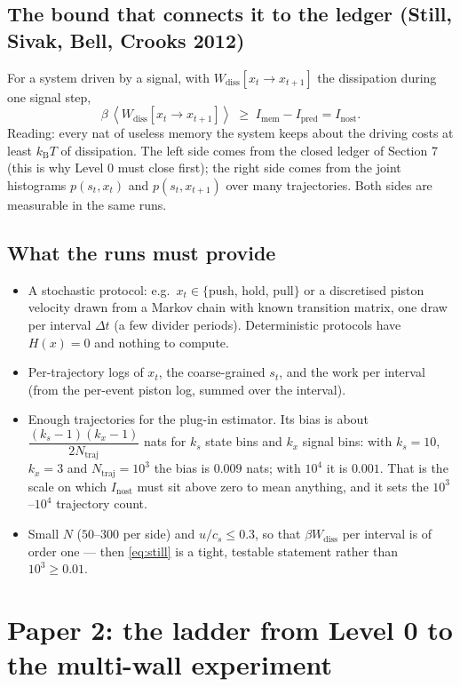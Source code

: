 \documentclass[11pt,a4paper]{article}
\newcommand{\kT}{k_{\mathrm B}T}
\newcommand{\eg}{e.g.\ }
\newcommand{\avg}[1]{\left\langle #1 \right\rangle}
\begin{document}
\subsection{The bound that connects it to the ledger (Still, Sivak, Bell, Crooks 2012)}
For a system driven by a signal, with $W_{\mathrm{diss}}[x_t\to x_{t+1}]$ the dissipation during one signal step,
\begin{equation}
\boxed{\;\beta\,\avg{W_{\mathrm{diss}}[x_t\to x_{t+1}]} \;\ge\; I_{\mathrm{mem}} - I_{\mathrm{pred}} = I_{\mathrm{nost}}.\;}
\label{eq:still}
\end{equation}
Reading: every nat of useless memory the system keeps about the driving costs at least $\kT$ of dissipation. The left side comes from the closed ledger of Section 7 (this is why Level 0 must close first); the right side comes from the joint histograms $p(s_t,x_t)$ and $p(s_t,x_{t+1})$ over many trajectories. Both sides are measurable in the same runs.

\subsection{What the runs must provide}
\begin{itemize}[nosep]
\item A stochastic protocol: \eg $x_t\in\{$push, hold, pull$\}$ or a discretised piston velocity drawn from a Markov chain with known transition matrix, one draw per interval $\Delta t$ (a few divider periods). Deterministic protocols have $H(x)=0$ and nothing to compute.
\item Per-trajectory logs of $x_t$, the coarse-grained $s_t$, and the work per interval (from the per-event piston log, summed over the interval).
\item Enough trajectories for the plug-in estimator. Its bias is about $\dfrac{(k_s - 1)(k_x - 1)}{2N_{\mathrm{traj}}}$ nats for $k_s$ state bins and $k_x$ signal bins: with $k_s = 10$, $k_x = 3$ and $N_{\mathrm{traj}} = 10^3$ the bias is $0.009$ nats; with $10^4$ it is $0.001$. That is the scale on which $I_{\mathrm{nost}}$ must sit above zero to mean anything, and it sets the $10^3$--$10^4$ trajectory count.
\item Small $N$ ($50$--$300$ per side) and $u/c_s\le0.3$, so that $\beta W_{\mathrm{diss}}$ per interval is of order one --- then \eqref{eq:still} is a tight, testable statement rather than $10^3 \ge 0.01$.
\end{itemize}


\section{Paper 2: the ladder from Level 0 to the multi-wall experiment}
\label{sec:ladder}
\end{document}
